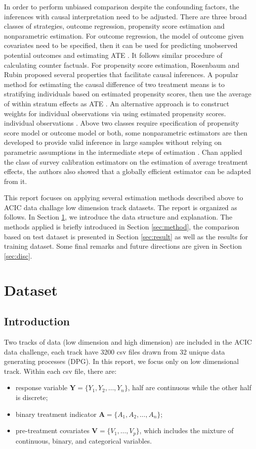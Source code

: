 \documentclass[12pt, oneside]{article}
\newcommand{\bA}{\mathbf{A}}
\newcommand{\bY}{\mathbf{Y}}
\newcommand{\bV}{\mathbf{V}}
\begin{document}
In order to perform unbiased comparison despite the confounding factors, the inferences with causal interpretation need to be adjusted. There are three broad classes of strategies, outcome regression, propensity score estimation and nonparametric estimation. For outcome regression, the model of outcome given covariates need to be specified, then it can be used for predicting unobserved potential outcomes and estimating ATE \cite{Oaxaca1973}. It follows similar procedure of calculating counter factuals. For propensity score estimation, Rosenbaum and Rubin \cite{Rosenbaum1983} proposed several properties that facilitate causal inferences. A popular method for estimating the causal difference of two treatment means is to stratifying individuals based on estimated propensity scores, then use the average of within stratum effects as ATE \cite{Rosenbaum1984}. An alternative approach is to construct weights for individual observations via using estimated propensity scores. individual observations \cite{Robins2000}. Above two classes require specification of propensity score model or outcome model or both, some nonparametric estimators are then developed to provide valid inference in large samples without relying on parametric assumptions in the intermediate steps of estimation \cite{Chen2008}. Chan  \cite{Chan2016} applied the class of survey calibration estimators on the estimation of average treatment effects, the authors also showed that a globally efficient estimator can be adapted from it. 

This report focuses on applying several estimation methods described above to ACIC data challage low dimension track datasets. The report is organized as follows. In Section \ref{sec:data}, we introduce the data structure and explanation. The methods applied is briefly introduced in Section \ref{sec:method}, the comparison based on test dataset is presented in Section \ref{sec:result} as well as the results for training dataset. Some final remarks and future directions are given in Section \ref{sec:disc}.

\section{Dataset}\label{sec:data}
\subsection{Introduction}
Two tracks of data (low dimension and high dimension) are included in the ACIC data challenge, each track have 3200 csv files drawn from 32 unique data generating processes (DPG). In this report, we focus only on low dimensional track. Within each csv file, there are:
\begin{itemize}
\setlength\itemsep{-0.5em}
\item response variable $\bY=\{Y_1,Y_2,\ldots,Y_n\}$, half are continuous while the other half is discrete;
\item binary treatment indicator $\bA=\{A_1,A_2,\ldots,A_n\}$;
\item pre-treatment covariates $\bV=\{V_1,\ldots,V_p\}$, which includes the mixture of continuous, binary, and categorical variables.
\end{itemize}
\end{document}
